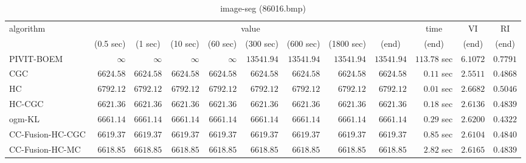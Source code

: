 \begin{table}[H]
\scriptsize
\centering
\caption{image-seg (86016.bmp)}
\label{tab:anytimetable-image-seg-86016.bmp}
\begin{tabular}{lrrrrrrrrrrr}
\toprule
           algorithm &                                   \multicolumn{8}{c}{value} & \multicolumn{1}{c}{time}    & \multicolumn{1}{c}{VI}  & \multicolumn{1}{c}{RI} \\  
\cmidrule(lr){2-9}\cmidrule(lr){10-10} \cmidrule(lr){11-11} \cmidrule(lr){12-12}   
                     & \multicolumn{1}{c}{(0.5 sec)} & \multicolumn{1}{c}{(1 sec)} & \multicolumn{1}{c}{(10 sec)} & \multicolumn{1}{c}{(60 sec)} & \multicolumn{1}{c}{(300 sec)} & \multicolumn{1}{c}{(600 sec)} & \multicolumn{1}{c}{(1800 sec)} & \multicolumn{1}{c}{(end)} & \multicolumn{1}{c}{(end)}    & \multicolumn{1}{c}{(end)}   & \multicolumn{1}{c}{(end)}  \\ \midrule 
          PIVIT-BOEM & $\infty$ & $\infty$ & $\infty$ & $\infty$ & $     13541.94$ & $     13541.94$ & $     13541.94$ & $     13541.94$ & $       113.78$ sec    & $       6.1072$  & $       0.7791$ \\ 
                 CGC & $      6624.58$ & $      6624.58$ & $      6624.58$ & $      6624.58$ & $      6624.58$ & $      6624.58$ & $      6624.58$ & $      6624.58$ & $         0.11$ sec    & $       2.5511$  & $       0.4868$ \\ 
                  HC & $      6792.12$ & $      6792.12$ & $      6792.12$ & $      6792.12$ & $      6792.12$ & $      6792.12$ & $      6792.12$ & $      6792.12$ & $         0.01$ sec    & $       2.6682$  & $       0.5046$ \\ 
              HC-CGC & $      6621.36$ & $      6621.36$ & $      6621.36$ & $      6621.36$ & $      6621.36$ & $      6621.36$ & $      6621.36$ & $      6621.36$ & $         0.18$ sec    & $       2.6136$  & $       0.4839$ \\ 
              ogm-KL & $      6661.14$ & $      6661.14$ & $      6661.14$ & $      6661.14$ & $      6661.14$ & $      6661.14$ & $      6661.14$ & $      6661.14$ & $         0.29$ sec    & $       2.6200$  & $       0.4322$ \\ 
    CC-Fusion-HC-CGC & $      6619.37$ & $      6619.37$ & $      6619.37$ & $      6619.37$ & $      6619.37$ & $      6619.37$ & $      6619.37$ & $      6619.37$ & $         0.85$ sec    & $       2.6104$  & $       0.4840$ \\ 
     CC-Fusion-HC-MC & $      6618.85$ & $      6618.85$ & $      6618.85$ & $      6618.85$ & $      6618.85$ & $      6618.85$ & $      6618.85$ & $      6618.85$ & $         2.82$ sec    & $       2.6165$  & $       0.4839$ \\ 

\end{tabular}
\end{table}
